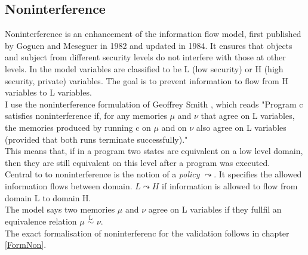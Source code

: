 \subsection{Noninterference}
Noninterference is an enhancement of the information flow model, first published by Goguen and Meseguer in 1982 and updated in 1984. It ensures that objects and subject from different security levels do not interfere with those at other levels. In the model variables are classified to be L (low security) or H (high security, private) variables. The goal is to prevent information to flow from H variables to L variables. \\
I use the noninterference formulation of Geoffrey Smith \cite{InfFlow}, which reads "Program c satisfies noninterference if, for any memories $\mu$ and $\nu$ that agree on L variables, the memories produced by running c on $\mu$ and on $\nu$ also agree on L variables (provided that both runs terminate successfully)." \\
This means that, if in a program two states are equivalent on a low level domain, then they are still equivalent on this level after a program was executed.\\
Central to to noninterference is the notion of a \textit{policy} $\leadsto$. It specifies the allowed information  flows between domain. $L \leadsto H$ if information is allowed to flow from domain L to domain H. \\
The model says two memories $\mu$ and $\nu$ agree on L variables if they fullfil an equivalence relation $\mu$ $\overset{\text{L}}{\sim}$ $\nu$. \\
The exact formalisation of noninterferenc for the validation follows in chapter \ref{FormNon}.